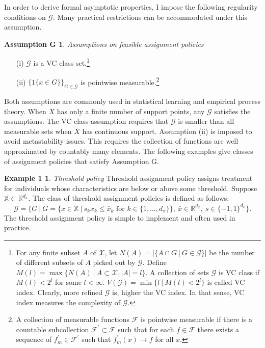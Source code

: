 \documentclass[12pt,oneside,reqno,english]{amsart}
\theoremstyle{definition}
\newtheorem*{ex1}{Example 1}
\newtheorem*{asmG}{Assumption G}
\begin{document}
In order to derive formal asymptotic properties, I impose the following regularity conditions on $\mathcal{G}$. 
Many practical restrictions can be accommodated under this assumption. 
\begin{asmG} \textit{Assumptions on feasible assignment policies}
\begin{itemize}
    \item[{(i)} ] $\mathcal{G}$ is a VC class set.\footnote{For any finite subset $A$ of $\mathcal{X}$, 
   let $N(A)=|\{A\cap G\ |\ G\in \mathcal{G} \}|$ be the number of different subsets of $A$ picked out by $\mathcal{G}$. 
   Define $M(l)=\max\{N(A)\ | \ A\subset \mathcal{X}, |A|=l\}$. A collection of sets $\mathcal{G}$ is VC class if $M(l)<2^{l}$ for some $l<\infty$. 
   $V(\mathcal{G})=\min\{l \ | \ M(l)<2^{l}\}$ is called VC index. Clearly, more refined $\mathcal{G}$ is, higher the VC index. In that sense, VC index measures the complexity of $\mathcal{G}$.}
    \item[{(ii)}] $\{1\{x\in G\}\}_{G\in \mathcal{G}}$ is pointwise measurable.\footnote{A collection of measurable functions $\mathcal{F}$ is pointwise measurable if 
    there is a countable subcollection $\mathcal{F}^{\prime}\subset \mathcal{F}$ such that for each $f\in \mathcal{F}$ there exists a sequence of $f^{\prime}_{m}\in \mathcal{F}^{\prime}$ such that $f^{\prime}_{m}(x)\rightarrow f$ for all $x$.}
    \end{itemize}    
\end{asmG}
Both assumptions are commonly used in statistical learning and empirical process theory.
When $X$ has only a finite number of support points, any $\mathcal{G}$ satisfies the assumptions. 
The VC class assumption requires that $\mathcal{G}$ is smaller than all measurable sets when $X$ has continuous support. 
Assumption (ii) is imposed to avoid metastability issues. This requires the collection of functions are well approximated by countably many elements.  
The following examples give classes of assignment policies that satisfy Assumption G. 
\begin{ex1}
\textit{Threshold policy} Threshold assignment policy assigns treatment for individuals whose characteristics are below or above some threshold.  
Suppose $\mathbb{X}\subset \mathbb{R}^{d_{x}}$. The class of threshold assignment policies is defined as follows:
\[\mathcal{G}=\{G\ |\ G=\{x\in \mathbb{X} \ | \ s_{k}x_{k}\leq \bar{x}_{k}\mbox{ for } k\in \{1,\ldots,d_{x}\}  \},\ \bar{x}\in \mathbb{R}^{d_{x}},\ s\in\{-1,1\}^{d_{x}} \}.\]
The threshold assignment policy is simple to implement and often used in practice. 
\end{ex1}
\end{document}
